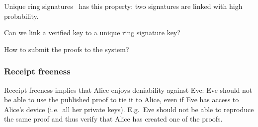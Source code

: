 
\begin{frame}
  \begin{remark}
    Unique ring signatures~\cite{UniqueRingSignatures} has this property: two 
    signatures are linked with high probability.
  \end{remark}

  \begin{question}
    Can we link a verified key to a unique ring signature key?
  \end{question}

  \pause{}

  \begin{question}
    How to submit the proofs to the system?
  \end{question}
\end{frame}

\subsubsection{Receipt freeness}

Receipt freeness implies that Alice enjoys deniability against Eve:
Eve should not be able to use the published proof to tie it to Alice, even if 
Eve has access to Alice's device (i.e.\ all her private keys).
E.g.\ Eve should not be able to reproduce the same proof and thus verify that 
Alice has created one of the proofs.

